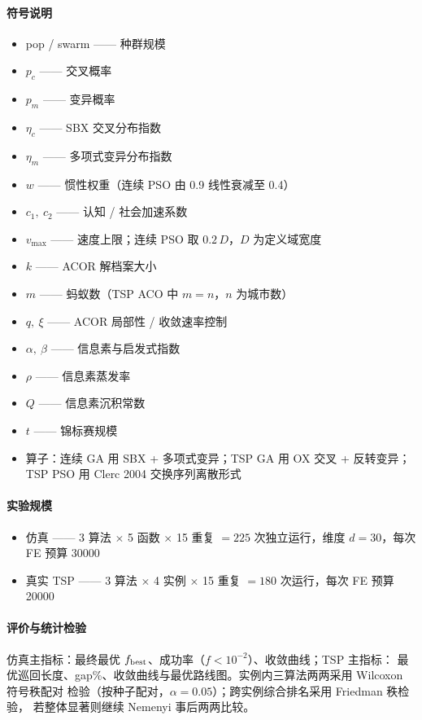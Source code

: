 \documentclass[12pt,a4paper,fontset=windows]{ctexart}
\begin{document}
\paragraph{符号说明}
\begin{itemize}\setlength{\itemsep}{0pt}
  \item pop / swarm —— 种群规模
  \item $p_c$ —— 交叉概率
  \item $p_m$ —— 变异概率
  \item $\eta_c$ —— SBX 交叉分布指数
  \item $\eta_m$ —— 多项式变异分布指数
  \item $w$ —— 惯性权重（连续 PSO 由 0.9 线性衰减至 0.4）
  \item $c_1,\ c_2$ —— 认知 / 社会加速系数
  \item $v_{\max}$ —— 速度上限；连续 PSO 取 $0.2\,D$，$D$ 为定义域宽度
  \item $k$ —— ACOR 解档案大小
  \item $m$ —— 蚂蚁数（TSP ACO 中 $m=n$，$n$ 为城市数）
  \item $q,\ \xi$ —— ACOR 局部性 / 收敛速率控制
  \item $\alpha,\ \beta$ —— 信息素与启发式指数
  \item $\rho$ —— 信息素蒸发率
  \item $Q$ —— 信息素沉积常数
  \item $t$ —— 锦标赛规模
  \item 算子：连续 GA 用 SBX + 多项式变异；TSP GA 用 OX 交叉 + 反转变异；TSP PSO 用 Clerc 2004 交换序列离散形式
\end{itemize}

\paragraph{实验规模}
\begin{itemize}\setlength{\itemsep}{0pt}
  \item 仿真 —— 3 算法 $\times$ 5 函数 $\times$ 15 重复 $= 225$ 次独立运行，维度 $d=30$，每次 FE 预算 30000
  \item 真实 TSP —— 3 算法 $\times$ 4 实例 $\times$ 15 重复 $= 180$ 次运行，每次 FE 预算 20000
\end{itemize}


\paragraph{评价与统计检验}
仿真主指标：最终最优 $f_{\rm best}$、成功率（$f<10^{-2}$）、收敛曲线；TSP 主指标：
最优巡回长度、gap\%、收敛曲线与最优路线图。实例内三算法两两采用 Wilcoxon 符号秩配对
检验（按种子配对，$\alpha=0.05$）；跨实例综合排名采用 Friedman 秩检验，
若整体显著则继续 Nemenyi 事后两两比较。
\end{document}
